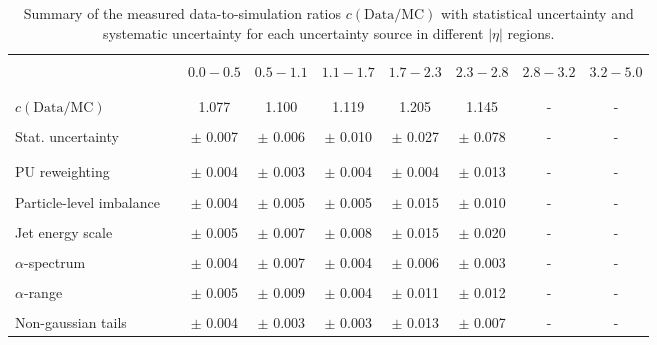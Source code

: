 \begin{table}[!htp]
\centering
\caption{Summary of the measured data-to-simulation ratios $c\mathrm{(Data/MC)}$ with statistical uncertainty and systematic uncertainty for each uncertainty source in different $|\eta|$ regions.}
\label{tab:syst_uncert_summary}
\begin{tabular}{lcccccccc}
\hline
\hline
 & & & & & & & & \\
 & & $0.0 - 0.5$ & $0.5 - 1.1$ & $1.1 - 1.7$ & $1.7 - 2.3$ & $2.3 - 2.8$ & $2.8 - 3.2$ & $3.2 - 5.0$ \\
 & & & & & & & & \\
 \hline
 & & & & & & & & \\
 $c\mathrm{(Data/MC)}$ & & 1.077 & 1.100 & 1.119 & 1.205 & 1.145 & - & - \\
 & & & & & & & & \\
 Stat. uncertainty & & $\pm$ 0.007 & $\pm$ 0.006 & $\pm$ 0.010 & $\pm$ 0.027 & $\pm$ 0.078 & - & - \\
 & & & & & & & & \\
\hline
 & & & & & & & & \\
 PU reweighting & & $\pm$ 0.004 & $\pm$ 0.003 & $\pm$ 0.004 & $\pm$ 0.004 & $\pm$ 0.013 & - & -  \\
 & & & & & & & & \\
 Particle-level imbalance & & $\pm$ 0.004 & $\pm$ 0.005 &$\pm$  0.005 & $\pm$ 0.015 & $\pm$ 0.010 & - & - \\
 & & & & & & & & \\
 Jet energy scale & & $\pm$ 0.005 & $\pm$ 0.007 & $\pm$ 0.008 & $\pm$ 0.015 & $\pm$ 0.020 & - & - \\
 & & & & & & & & \\
 $\alpha$-spectrum & & $\pm$ 0.004 & $\pm$ 0.007 & $\pm$ 0.004 & $\pm$ 0.006 & $\pm$ 0.003 & - & - \\
 & & & & & & & & \\
 $\alpha$-range & & $\pm$ 0.005 & $\pm$ 0.009 & $\pm$ 0.004 & $\pm$ 0.011 & $\pm$ 0.012 & - & - \\
 & & & & & && &  \\
 Non-gaussian tails & & $\pm$ 0.004 & $\pm$ 0.003 & $\pm$ 0.003 & $\pm$ 0.013 &$\pm$ 0.007 & - & - \\

\end{tabular}
\end{table}
